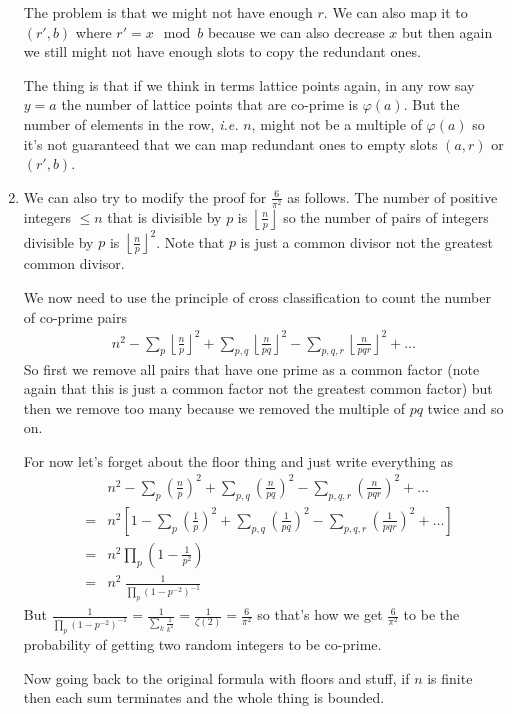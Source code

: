 \documentclass[aps,preprint,preprintnumbers,nofootinbib,showpacs,prd]{revtex4-1}
\newcommand{\ie}{{\it i.e.} }
\newcommand{\nbea}{\begin{eqnarray*}}
\newcommand{\neea}{\end{eqnarray*}}
\begin{document}
\begin{enumerate}
The problem is that we might not have enough $r$. We can also map it to $(r', b)$ where $r' = x \mod b$ because we can also decrease $x$ but then again we still might not have enough slots to copy the redundant ones.

The thing is that if we think in terms lattice points again, in any row say $y=a$ the number of lattice points that are co-prime is $\varphi(a)$. But the number of elements in the row, \ie $n$, might not be a multiple of $\varphi(a)$ so it's not guaranteed that we can map redundant ones to empty slots $(a,r)$ or $(r', b)$.
%
\item We can also try to modify the proof for $\frac{6}{\pi^2}$ as follows. The number of positive integers $\le n$ that is divisible by $p$ is $\left \lfloor \frac{n}{p}\right \rfloor$ so the number of pairs of integers divisible by $p$ is  $\left \lfloor \frac{n}{p}\right \rfloor^2$. Note that $p$ is just a common divisor not the greatest common divisor.

We now need to use the principle of cross classification to count the number of co-prime pairs 
%
\nbea
n^2 - \sum_p \left \lfloor \frac{n}{p}\right \rfloor^2 + \sum_{p,q} \left \lfloor \frac{n}{pq}\right \rfloor^2 - \sum_{p,q,r} \left \lfloor \frac{n}{pqr}\right \rfloor^2 + \dots
\neea
%
So first we remove all pairs that have one prime as a common factor (note again that this is just a common factor not the greatest common factor) but then we remove too many because we removed the multiple of $pq$ twice and so on.

For now let's forget about the floor thing and just write everything as
%
\nbea
&& n^2 - \sum_p \left ( \frac{n}{p}\right )^2 + \sum_{p,q} \left ( \frac{n}{pq}\right )^2 - \sum_{p,q,r} \left ( \frac{n}{pqr}\right )^2 + \dots \\
& = & n^2 \left \lbrack 1 - \sum_p \left ( \frac{1}{p}\right )^2 + \sum_{p,q} \left ( \frac{1}{pq}\right )^2 - \sum_{p,q,r} \left ( \frac{1}{pqr}\right )^2 + \dots \right \rbrack \\
& = & n^2 \prod_p \left ( 1- \frac{1}{p^2}\right ) \\
& = & n^2 ~ \frac{1}{\prod_p \left ( 1- p^{-2}\right )^{-1}} 
\neea
%
But $\frac{1}{\prod_p \left ( 1- p^{-2}\right )^{-1}} = \frac{1}{\sum_k \frac{1}{k^2}} = \frac{1}{\zeta(2)} = \frac{6}{\pi^2}$ so that's how we get $\frac{6}{\pi^2}$ to be the probability of getting two random integers to be co-prime.

Now going back to the original formula with floors and stuff, if $n$ is finite then each sum terminates and the whole thing is bounded.


\end{enumerate}
\end{document}
